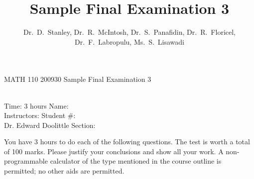 \documentclass[12pt]{article}
\title{Sample Final Examination 3}
\author{Dr.\ D.\ Stanley, Dr.\ R.\ McIntosh, Dr.\ S.\ Panafidin, 
  Dr.\ R.\ Floricel, Dr.\ F.\ Labropulu, Ms.\ S.\ Lisawadi}
\begin{document}
\thispagestyle{plain}

\begin{center}
  \LARGE{MATH 110 200930 Sample Final Examination 3}
\end{center}

\begin{flushleft}
\quad\\
Time:  3 hours                  \hfill       Name: \underline{\hspace{2in}}  \\
Instructors:                    \hfill Student \#: \underline{\hspace{2in}}  \\
\quad Dr. Edward Doolittle      \hfill    Section: \underline{\hspace{2in}}  \\
\end{flushleft}


\noindent
You have 3 hours to do each of the following questions.
The test is worth a total of 100 marks.
Please justify your conclusions and
show all your work.
A non-programmable calculator of the type mentioned in the course outline
is permitted; no other aids are permitted.
\end{document}
